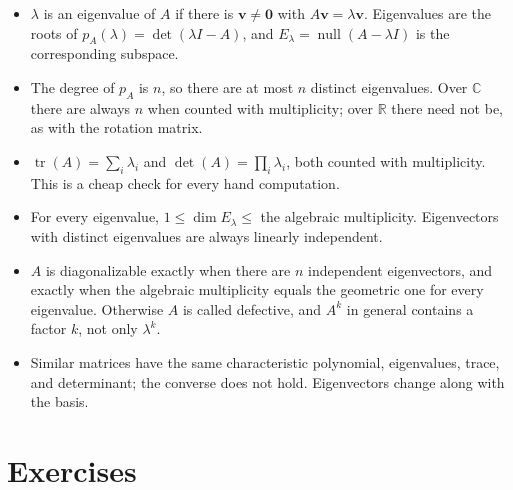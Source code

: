 \begin{ringkasan}
\begin{itemize}
  \item $\lambda$ is an eigenvalue of $A$ if there is $\mathbf{v}\neq\mathbf{0}$ with
        $A\mathbf{v}=\lambda\mathbf{v}$. Eigenvalues are the roots of
        $p_{A}(\lambda)=\det(\lambda I-A)$, and $E_{\lambda}=\operatorname{null}(A-\lambda I)$ is
        the corresponding subspace.
  \item The degree of $p_{A}$ is $n$, so there are at most $n$ distinct eigenvalues. Over
        $\mathbb{C}$ there are always $n$ when counted with multiplicity; over $\mathbb{R}$ there
        need not be, as with the rotation matrix.
  \item $\operatorname{tr}(A)=\sum_{i}\lambda_{i}$ and $\det(A)=\prod_{i}\lambda_{i}$, both
        counted with multiplicity. This is a cheap check for every hand computation.
  \item For every eigenvalue, $1\le\dim E_{\lambda}\le$ the algebraic multiplicity. Eigenvectors
        with distinct eigenvalues are always linearly independent.
  \item $A$ is diagonalizable exactly when there are $n$ independent eigenvectors, and exactly
        when the algebraic multiplicity equals the geometric one for every eigenvalue. Otherwise
        $A$ is called defective, and $A^{k}$ in general contains a factor $k$, not only
        $\lambda^{k}$.
  \item Similar matrices have the same characteristic polynomial, eigenvalues, trace, and
        determinant; the converse does not hold. Eigenvectors change along with the basis.
\end{itemize}
\end{ringkasan}

\section{Exercises}

